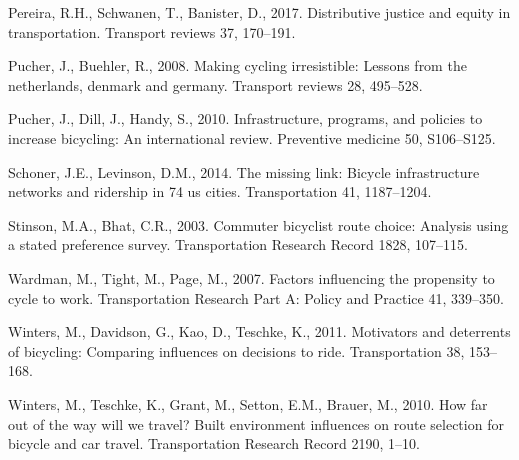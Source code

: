 \documentclass[]{elsarticle} %
\begin{document}
\leavevmode\hypertarget{ref-pereira2017distributive}{}%
Pereira, R.H., Schwanen, T., Banister, D., 2017. Distributive justice
and equity in transportation. Transport reviews 37, 170--191.

\leavevmode\hypertarget{ref-pucher2008making}{}%
Pucher, J., Buehler, R., 2008. Making cycling irresistible: Lessons from
the netherlands, denmark and germany. Transport reviews 28, 495--528.

\leavevmode\hypertarget{ref-pucher2010infrastructure}{}%
Pucher, J., Dill, J., Handy, S., 2010. Infrastructure, programs, and
policies to increase bicycling: An international review. Preventive
medicine 50, S106--S125.

\leavevmode\hypertarget{ref-schoner2014missing}{}%
Schoner, J.E., Levinson, D.M., 2014. The missing link: Bicycle
infrastructure networks and ridership in 74 us cities. Transportation
41, 1187--1204.

\leavevmode\hypertarget{ref-stinson2003commuter}{}%
Stinson, M.A., Bhat, C.R., 2003. Commuter bicyclist route choice:
Analysis using a stated preference survey. Transportation Research
Record 1828, 107--115.

\leavevmode\hypertarget{ref-wardman2007factors}{}%
Wardman, M., Tight, M., Page, M., 2007. Factors influencing the
propensity to cycle to work. Transportation Research Part A: Policy and
Practice 41, 339--350.

\leavevmode\hypertarget{ref-winters2011motivators}{}%
Winters, M., Davidson, G., Kao, D., Teschke, K., 2011. Motivators and
deterrents of bicycling: Comparing influences on decisions to ride.
Transportation 38, 153--168.

\leavevmode\hypertarget{ref-winters2010far}{}%
Winters, M., Teschke, K., Grant, M., Setton, E.M., Brauer, M., 2010. How
far out of the way will we travel? Built environment influences on route
selection for bicycle and car travel. Transportation Research Record
2190, 1--10.
\end{document}
